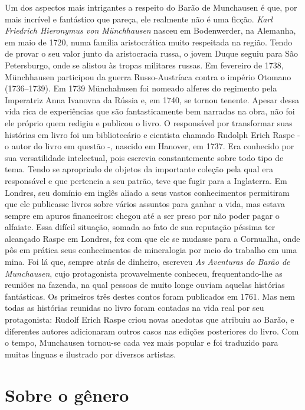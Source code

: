 \documentclass[11pt]{extarticle}
\begin{document}
Um dos aspectos mais intrigantes a respeito do Barão de Munchausen é que, por mais incrível e fantástico que pareça, ele realmente não é uma ficção. \textit{Karl Friedrich Hieronymus von Münchhausen} nasceu em Bodenwerder, na Alemanha, em maio de 1720, numa família aristocrática muito respeitada na região. Tendo de provar o seu valor junto da aristocracia russa, o jovem Duque seguiu para São Petersburgo, onde se alistou às tropas militares russas. Em fevereiro de 1738, Münchhausen participou da guerra Russo-Austríaca contra o império Otomano (1736–1739). Em 1739 Münchahusen foi nomeado alferes do regimento pela Imperatriz Anna Ivanovna da Rússia e, em 1740, se tornou tenente. Apesar dessa vida rica de experiências que são fantasticamente bem narradas na obra, não foi ele próprio quem redigiu e publicou o livro. O responsável por transformar suas histórias em livro foi um bibliotecário e cientista chamado Rudolph Erich Raspe - o autor do livro em questão -, nascido em Hanover, em 1737. Era conhecido por sua versatilidade intelectual, pois escrevia constantemente sobre todo tipo de tema. Tendo se apropriado de objetos da importante coleção pela qual era responsável e que pertencia a seu patrão, teve que fugir para a Inglaterra. Em Londres, seu domínio em inglês aliado a seus vastos conhecimentos permitiram que ele publicasse livros sobre vários assuntos para ganhar a vida, mas estava sempre em apuros financeiros: chegou até a ser preso por não poder pagar o alfaiate. Essa difícil situação, somada ao fato de sua reputação péssima ter alcançado Raspe em Londres, fez com que ele se mudasse para a Cornualha, onde pôs em prática seus conhecimentos de mineralogia por meio do trabalho em uma mina. Foi lá que, sempre atrás de dinheiro, escreveu \textit{As Aventuras do Barão de Munchausen}, cujo protagonista provavelmente conheceu, frequentando-lhe as reuniões na fazenda, na qual pessoas de muito longe ouviam aquelas histórias fantásticas. Os primeiros três destes contos foram publicados em 1761. Mas nem todas as histórias reunidas no livro foram contadas na vida real por seu protagonista: Rudolf Erich Raspe criou novas anedotas que atribuiu ao Barão, e diferentes autores adicionaram outros casos nas edições posteriores do livro. Com o tempo, Munchausen tornou-se cada vez mais popular e foi traduzido para muitas línguas e ilustrado por diversos artistas.


\section{Sobre o gênero}
\end{document}

